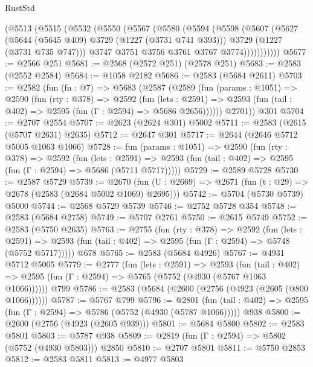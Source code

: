 \begin{lexlean}{RustStd}
\begin{coremodule}
        (@5513
          (@5515
            (@5532
              (@5550
                (@5567
                  (@5580
                    (@5594
                      (@5598
                        (@5607
                          (@5627
                            (@5644 (@5645 @409) @3729 (@1227 (@3731 @741 @393)))
                            @3729
                            (@1227 (@3731 @735 @747)))
                          @3747
                          @3751
                          @3756
                          @3761
                          @3767
                          @3774)))))))))))
@5677 := @2566 @251
@5681 := @2568 (@2572 @251) (@2578 @251)
@5683 := @2583 (@2552 @2584)
@5684 := @1058 @2182
@5686 := @2583 (@5684 @2611)
@5703 := @2582
    (fun (fn : @7) =>
    @5683
      (@2587
        (@2589
          (fun (params : @1051) =>
          @2590
            (fun (rty : @378) =>
            @2592
              (fun (lets : @2591) =>
              @2593 (fun (tail : @402) => @2595 (fun (Γ : @2594) => @5686 @2656))))))
        @2701))
    @301
@5704 := @2707 @2554
@5707 := @2623 (@2624 @301) @5002
@5711 := @2583 (@2615 (@5707 @2631) @2635)
@5712 := @2647 @301
@5717 := @2644 (@2646 @5712 @5005 @1063 @1066)
@5728 := fun (params : @1051) =>
  @2590
    (fun (rty : @378) =>
    @2592
      (fun (lets : @2591) =>
      @2593 (fun (tail : @402) => @2595 (fun (Γ : @2594) => @5686 (@5711 @5717)))))
@5729 := @2589 @5728
@5730 := @2587 @5729
@5739 := @2670 (fun (U : @2669) => @2671 (fun (t : @29) => @2678 (@2583 (@2684 @5002 @1069) @2695)))
@5742 := @5704 (@5730 @5739) @5000
@5744 := @2568 @5729 @5739
@5746 := @2752 @5728 @354
@5748 := @2583 (@5684 @2758)
@5749 := @5707 @2761
@5750 := @2615 @5749
@5752 := @2583 (@5750 @2635)
@5763 := @2755
    (fun (rty : @378) =>
    @2592
      (fun (lets : @2591) =>
      @2593 (fun (tail : @402) => @2595 (fun (Γ : @2594) => @5748 (@5752 @5717)))))
    @678
@5765 := @2583 (@5684 @4926)
@5767 := @4931 @5712 @5005
@5779 := @2777
    (fun (lets : @2591) =>
    @2593
      (fun (tail : @402) => @2595 (fun (Γ : @2594) => @5765 (@5752 (@4930 (@5767 @1063 @1066))))))
    @799
@5786 := @2583 (@5684 (@2600 (@2756 (@4923 (@2605 (@800 @1066))))))
@5787 := @5767 @799
@5796 := @2801
    (fun (tail : @402) => @2595 (fun (Γ : @2594) => @5786 (@5752 (@4930 (@5787 @1066)))))
    @938
@5800 := @2600 (@2756 (@4923 (@2605 @939)))
@5801 := @5684 @5800
@5802 := @2583 @5801
@5803 := @5787 @938
@5809 := @2819 (fun (Γ : @2594) => @5802 (@5752 (@4930 @5803))) @2850
@5810 := @2707 @5801
@5811 := @5750 @2853
@5812 := @2583 @5811
@5813 := @4977 @5803

\end{coremodule}
\end{lexlean}
